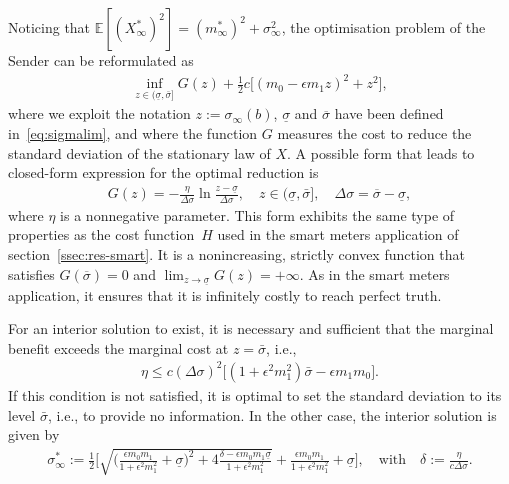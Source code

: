 \documentclass[a4paper,10pt]{article}
\theoremstyle{definition}
\theoremstyle{plain}
\numberwithin{equation}{section}
\begin{document}
Noticing that $\mathbb E[(X^\ast_\infty)^2]= (m_\infty^\ast)^2 + \sigma_\infty^2$, the optimisation problem of the Sender can be reformulated as
\begin{align*}
	\inf_{z \in (\underline\sigma, \bar\sigma]} G(z) + \frac 12 c \big[ (m_0 - \epsilon m_1 z)^2 + z^2\big],
\end{align*}
where we exploit the notation $z := \sigma_\infty(b)$, $\underline\sigma$ and $\overline\sigma$ have been defined in~\eqref{eq:sigmalim}, and where the function $G$ measures the cost to reduce the standard deviation of the stationary law of $X$. A possible form that leads to closed-form expression for the optimal reduction is
\begin{align*}
G(z) = -  \frac{\eta}{\Delta \sigma} \ln\frac{z - \underline\sigma}{\Delta\sigma}, \quad z \in (\underline\sigma, \bar\sigma], \quad \Delta\sigma = \overline\sigma - \underline\sigma,
\end{align*}
where $\eta$ is a nonnegative parameter. This form exhibits the same type of properties as the cost function~$H$ used in the smart meters application of section~\ref{ssec:res-smart}. It is a nonincreasing, strictly convex function that satisfies $G(\overline\sigma) = 0$ and $\lim_{z\to\underline\sigma} G(z) = + \infty$. As in the smart meters application, it ensures that it is infinitely costly to reach perfect truth.

For an interior solution to exist, it is necessary and sufficient that the marginal benefit exceeds the marginal cost at $z =\bar\sigma$, i.e.,
\begin{align*}
 \eta  \leq c (\Delta\sigma)^2 \big[  (1 + \epsilon^2 m_1^2) \bar\sigma -\epsilon m_1m_0\big].
\end{align*}
If this condition is not satisfied, it is optimal to set the standard deviation to its level $\bar\sigma$, i.e., to provide no information. In the other case, the interior solution is given by
\begin{align}\label{eq:sigmaCF}
\sigma^\ast_\infty := \frac12 \Bigg[ 
 \sqrt{ \Big(\frac{\epsilon m_0 m_1}{1+\epsilon^2 m_1^2} + \underline\sigma\Big)^2 + 4 \frac{\delta - \epsilon   m_0 m_1 \underline\sigma}{1+\epsilon^2 m_1^2}} + \frac{\epsilon m_0 m_1}{1+\epsilon^2 m_1^2} + \underline\sigma  \Bigg], \quad
\text{with} \quad
\delta := \frac{\eta}{c \Delta\sigma}.
\end{align}
\end{document}
